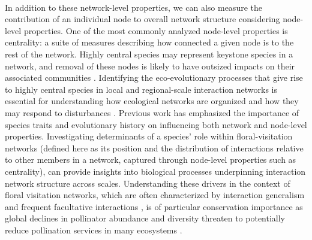 \paragraph*{}
In addition to these network-level properties, we can also measure the contribution of an individual node to overall network structure considering node-level properties. One of the most commonly analyzed node-level properties is centrality: a suite of measures describing how connected a given node is to the rest of the network. Highly central species may represent keystone species in a network, and removal of these nodes is likely to have outsized impacts on their associated communities \parencite{traveset2017plant, maia2019plant, martins2024propagation}. Identifying the eco-evolutionary processes that give rise to highly central species in local and regional-scale interaction networks is essential for understanding how ecological networks are organized and how they may respond to disturbances \parencite{moulatlet2023species, martins2025determinants, zhang2025network}. Previous work has emphasized the importance of species traits \parencite{watts2016influence, lazaro2020linking, maia2019plant} and evolutionary history \parencite{Gonzales2015macroecology, burin2021macroevolutionary} on influencing both network and node-level properties. Investigating determinants of a species' role within floral-visitation networks (defined here as its position and the distribution of interactions relative to other members in a network, captured through node-level properties such as centrality), can provide insights into biological processes underpinning interaction network structure across scales. Understanding these drivers in the context of floral visitation networks, which are often characterized by interaction generalism \parencite{waser1996generalization,stanton2003interacting} and frequent facultative interactions \parencite{geib2012tracing}, is of particular conservation importance as global declines in pollinator abundance and diversity threaten to potentially reduce pollination services in many ecosystems \parencite{potts2010global, rodger2021widespread}. 


